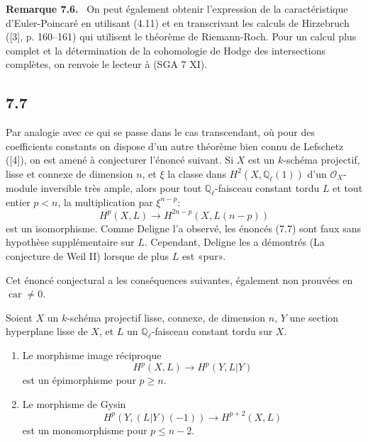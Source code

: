 \documentclass[11pt]{article}
\newenvironment{statement}[1]{\par\medskip\noindent\textbf{#1.}\ }{\par\medskip}
\begin{document}
\begin{statement}{Remarque 7.6}
On peut également obtenir l'expression de la caractéristique d'Euler-Poincaré en utilisant (4.11) et en transcrivant les calculs de Hirzebruch ([3], p. 160--161) qui utilisent le théorème de Riemann-Roch. Pour un calcul plus complet et la détermination de la cohomologie de Hodge des intersections complètes, on renvoie le lecteur à (SGA 7 XI).
\end{statement}

\subsection*{7.7}

Par analogie avec ce qui se passe dans le cas transcendant, où pour des coefficients constants on dispose d'un autre théorème bien connu de Lefschetz ([4]), on est amené à conjecturer l'énoncé suivant. Si $X$ est un $k$-schéma projectif, lisse et connexe de dimension $n$, et $\xi$ la classe dans $H^2(X,\mathbb Q_\ell(1))$ d'un $\mathcal O_X$-module inversible très ample, alors pour tout $\mathbb Q_\ell$-faisceau constant tordu $L$ et tout entier $p<n$, la multiplication par $\xi^{n-p}$:
\[
H^p(X,L)\to H^{2n-p}(X,L(n-p))
\]
est un isomorphisme. Comme Deligne l'a observé, les énoncés (7.7) sont faux sans hypothèse supplémentaire sur $L$. Cependant, Deligne les a démontrés (La conjecture de Weil II) lorsque de plus $L$ est «pur».

Cet énoncé conjectural a les conséquences suivantes, également non prouvées en $\operatorname{car}\ne0$.

Soient $X$ un $k$-schéma projectif lisse, connexe, de dimension $n$, $Y$ une section hyperplane lisse de $X$, et $L$ un $\mathbb Q_\ell$-faisceau constant tordu sur $X$.
\begin{enumerate}[label=(\roman*)]
\item Le morphisme image réciproque
\[
H^p(X,L)\to H^p(Y,L|Y)
\]
est un épimorphisme pour $p\ge n$.
\item Le morphisme de Gysin
\[
H^p(Y,(L|Y)(-1))\to H^{p+2}(X,L)
\]
est un monomorphisme pour $p\le n-2$.
\end{enumerate}
\end{document}

